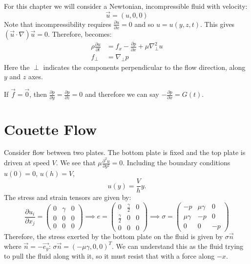 \documentclass[../Main.tex]{subfiles}
\begin{document}
For this chapter we will consider a Newtonian, incompressible fluid with velocity:
\begin{equation*}
    \vec{u} = (u, 0, 0)
\end{equation*}
Note that incompressibility requires $\frac{\partial u}{\partial x} = 0$ and so $u = u(y, z, t)$. This gives $(\vec{u} \cdot \nabla)\vec{u} = 0$. Therefore,  becomes:
\begin{align}
    \rho \frac{\partial u}{\partial t} &= f_x - \frac{\partial p}{\partial x} + \mu \nabla_\perp^2 u \label{eqnNSOneDPll} \\
    f_\perp &= \nabla_\perp p \label{eqnNSOneDPerp}
\end{align}
Here the $\perp$ indicates the components perpendicular to the flow direction, along $y$ and $z$ axes.

If $\vec{f} = \vec0$, then $\frac{\partial p}{\partial y} = \frac{\partial p}{\partial z} = 0$ and therefore we can say $-\frac{\partial p}{\partial x} = G(t)$.
\section{Couette Flow}
Consider flow between two plates. The bottom plate is fixed and the top plate is driven at speed $V$. We see that $\mu \frac{\partial^{2}u}{\partial y^{2}} = 0$. Including the boundary conditions $u(0) = 0$, $u(h) = V$,
\begin{equation*}
    u(y) = \frac{V}{h}y.
\end{equation*}
The stress and strain tensors are given by:
\begin{equation*}
    \frac{\partial u_i}{\partial x_j} =
    \begin{pmatrix}
        0 & \gamma & 0 \\
        0 & 0 & 0 \\
        0 & 0 & 0
    \end{pmatrix}
    \implies e =
    \begin{pmatrix}
        0 & \frac\gamma2 & 0 \\
        \frac\gamma2 & 0 & 0 \\
        0 & 0 & 0
    \end{pmatrix}
    \implies \sigma =
    \begin{pmatrix}
        -p & \mu \gamma & 0 \\
        \mu \gamma & -p & 0 \\
        0 & 0 & -p
    \end{pmatrix}
\end{equation*}
Therefore, the stress exerted by the bottom plate on the fluid is given by $\sigma \vec{n}$ where $\vec{n} = -\vec{e_y}$: $\sigma\vec{n} = (-\mu \gamma, 0, 0)^T$. We can understand this as the fluid trying to pull the fluid along with it, so it must resist that with a force along $-x$.
\end{document}
